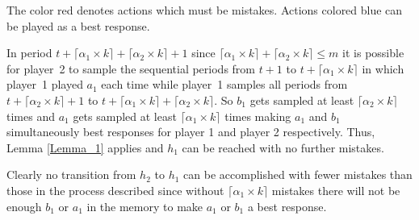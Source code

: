\documentclass[11.5pt]{article}
\begin{document}
\begin{table}[htbp]
\centering
{}
\small
The color red denotes actions which must be mistakes. Actions colored blue can be played as a best response.
\end{table}


In period $t + \lceil \alpha_1 \times k \rceil + \lceil \alpha_2 \times k \rceil + 1$ since $\lceil \alpha_1 \times k \rceil + \lceil \alpha_2 \times k \rceil \leq m$ it is possible for player~2 to sample the sequential periods from $t + 1$ to $t + \lceil \alpha_1 \times k \rceil$ in which player~1 played $a_1$ each time while player~1 samples all periods from $t+\lceil \alpha_2 \times k \rceil + 1$ to $t + \lceil \alpha_1 \times k \rceil + \lceil \alpha_2 \times k \rceil$. So $b_1$ gets sampled at least $\lceil \alpha_2 \times k \rceil$ times and $a_1$ gets sampled at least $\lceil \alpha_1 \times k \rceil$ times making $a_1$ and $b_1$ simultaneously best responses for player 1 and player 2 respectively. Thus, Lemma \ref{Lemma_1} applies and $h_1$ can be reached with no further mistakes. 

Clearly no transition from $h_2$ to $h_1$ can be accomplished with fewer mistakes than those in the process described since without $\lceil \alpha_1 \times k \rceil$ mistakes there will not be enough $b_1$ or $a_1$ in the memory to make $a_1$ or $b_1$ a best response. 
\end{document}
